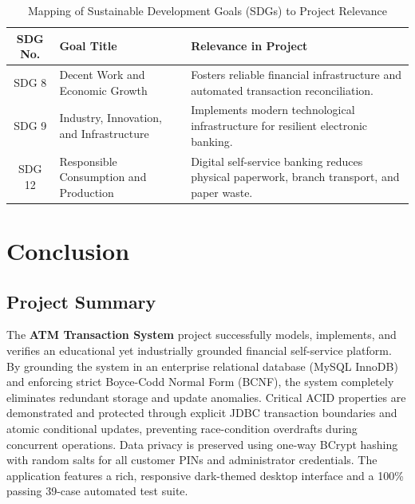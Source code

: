 \documentclass[11pt,a4paper]{report}
\begin{document}
\begin{table}[htbp]
    \centering
    \caption{Mapping of Sustainable Development Goals (SDGs) to Project Relevance}
    \renewcommand{\arraystretch}{1.3}
    \begin{tabular}{|c|p{5.5cm}|p{8cm}|}
        \hline
        \textbf{SDG No.} & \textbf{Goal Title} & \textbf{Relevance in Project} \\
        \hline
        SDG 8 & Decent Work and Economic Growth & Fosters reliable financial infrastructure and automated transaction reconciliation. \\
        \hline
        SDG 9 & Industry, Innovation, and Infrastructure & Implements modern technological infrastructure for resilient electronic banking. \\
        \hline
        SDG 12 & Responsible Consumption and Production & Digital self-service banking reduces physical paperwork, branch transport, and paper waste. \\
        \hline
    \end{tabular}
    \label{tab:sdg_mapping}
\end{table}

\newpage

\section{Conclusion}

\subsection{Project Summary}
The \textbf{ATM Transaction System} project successfully models, implements, and verifies an educational yet industrially grounded financial self-service platform. By grounding the system in an enterprise relational database (MySQL InnoDB) and enforcing strict Boyce-Codd Normal Form (BCNF), the system completely eliminates redundant storage and update anomalies. Critical ACID properties are demonstrated and protected through explicit JDBC transaction boundaries and atomic conditional updates, preventing race-condition overdrafts during concurrent operations. Data privacy is preserved using one-way BCrypt hashing with random salts for all customer PINs and administrator credentials. The application features a rich, responsive dark-themed desktop interface and a 100\% passing 39-case automated test suite.
\end{document}
